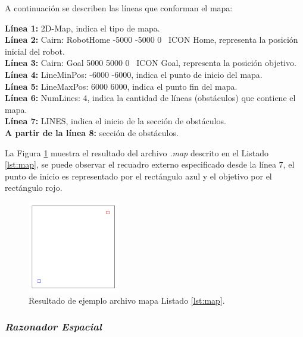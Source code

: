 \documentclass[11pt,twoside,A5]{article}
\newcommand{\reflistings}[1]{Listado \ref{#1}}
\newcommand{\reffigure}[1]{Figura \ref{#1}}
\newcommand{\sourcecode}[2][\footnotesize]{{\ttfamily#1#2}}
\begin{document}
A continuación se describen las líneas que conforman el mapa:

\noindent\textbf{Línea 1:} \sourcecode{2D-Map}, indica el tipo de mapa.
\\\textbf{Línea 2:} \sourcecode{Cairn: RobotHome -5000 -5000 0 \textquotedbl\textquotedbl~ICON \textquotedbl Home\textquotedbl}, representa la posición inicial del robot.
\\\textbf{Línea 3:} \sourcecode{Cairn: Goal 5000 5000 0 \textquotedbl\textquotedbl~ICON \textquotedbl Goal\textquotedbl}, representa la posición objetivo.
\\\textbf{Línea 4:} \sourcecode{LineMinPos: -6000 -6000}, indica el punto de inicio del mapa.
\\\textbf{Línea 5:} \sourcecode{LineMaxPos: 6000 6000}, indica el punto fin del mapa.
\\\textbf{Línea 6:} \sourcecode{NumLines: 4}, indica la cantidad de líneas (obstáculos) que contiene el mapa.
\\\textbf{Línea 7:} \sourcecode{LINES}, indica el inicio de la sección de obstáculos.
\\\textbf{A partir de la línea 8:} sección de obstáculos.

La \reffigure{fig:map} muestra el resultado del archivo \textit{.map} descrito en el \reflistings{lst:map}, se puede observar el recuadro
externo especificado desde la línea 7, el punto de inicio es representado por el rectángulo azul y el objetivo por el rectángulo rojo.

\begin{figure}[H]
\begin{center}
\includegraphics[width=4cm]{map.png} 
\caption{Resultado de ejemplo archivo mapa \reflistings{lst:map}.}
\label{fig:map}
\end{center}
\end{figure} 

\subsubsection*{\textit{Razonador Espacial}}
\end{document}

